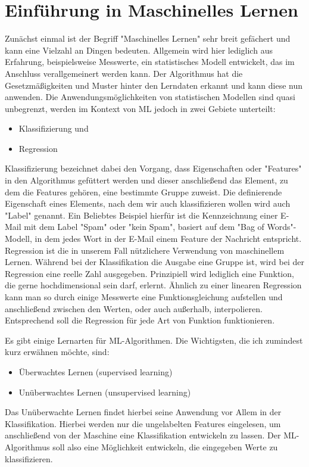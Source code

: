 \section{Einführung in Maschinelles Lernen}
Zunächst einmal ist der Begriff "Maschinelles Lernen" sehr breit gefächert und kann eine Vielzahl an Dingen bedeuten. Allgemein wird hier lediglich aus Erfahrung, beispielsweise Messwerte, ein statistisches Modell entwickelt, das im Anschluss verallgemeinert werden kann. Der Algorithmus hat die Gesetzmäßigkeiten und Muster hinter den Lerndaten erkannt und kann diese nun anwenden. Die Anwendungsmöglichkeiten von statistischen Modellen sind quasi unbegrenzt, werden im Kontext von ML jedoch in zwei Gebiete unterteilt:
\begin{itemize}
	\item Klassifizierung und
	\item Regression
\end{itemize}
Klassifizierung bezeichnet dabei den Vorgang, dass Eigenschaften oder "Features" in den Algorithmus gefüttert werden und dieser anschließend das Element, zu dem die Features gehören, eine bestimmte Gruppe zuweist. Die definierende Eigenschaft eines Elements, nach dem wir auch klassifizieren wollen wird auch "Label" genannt. Ein Beliebtes Beispiel hierfür ist die Kennzeichnung einer E-Mail mit dem Label "Spam" oder "kein Spam", basiert auf dem "Bag of Words"-Modell, in dem jedes Wort in der E-Mail einem Feature der Nachricht entspricht. 
Regression ist die in unserem Fall nützlichere Verwendung von maschinellem Lernen. Während bei der Klassifikation die Ausgabe eine Gruppe ist, wird bei der Regression eine reelle Zahl ausgegeben. Prinzipiell wird lediglich eine Funktion, die gerne hochdimensional sein darf, erlernt. Ähnlich zu einer linearen Regression kann man so durch einige Messwerte eine Funktionsgleichung aufstellen und anschließend zwischen den Werten, oder auch außerhalb, interpolieren. Entsprechend soll die Regression für jede Art von Funktion funktionieren.

Es gibt einige Lernarten für ML-Algorithmen. Die Wichtigsten, die ich zumindest kurz erwähnen möchte, sind:
\begin{itemize}
	\item Überwachtes Lernen (supervised learning)
	\item Unüberwachtes Lernen (unsupervised learning)
\end{itemize}
Das Unüberwachte Lernen findet hierbei seine Anwendung vor Allem in der Klassifikation. Hierbei werden nur die ungelabelten Features eingelesen, um anschließend von der Maschine eine Klassifikation entwickeln zu lassen. Der ML-Algorithmus soll also eine Möglichkeit entwickeln, die eingegeben Werte zu klassifizieren. 

